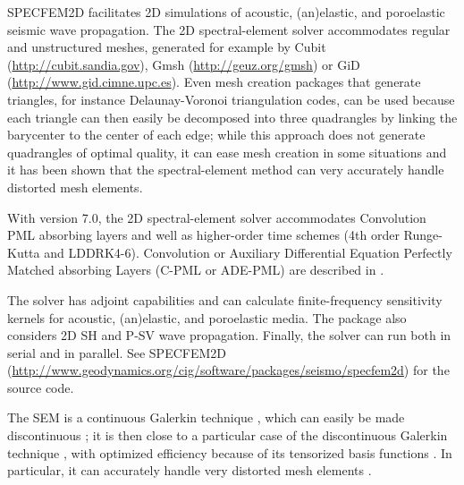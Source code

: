 \documentclass[oneside,english,onecolumn,letterpaper]{book}
\newcommand{\urlwithparentheses}[1]{(\url{#1})}
\begin{document}

SPECFEM2D facilitates 2D simulations of
acoustic, (an)elastic, and poroelastic seismic wave propagation.
The 2D spectral-element solver accommodates
regular and unstructured meshes, generated for example by Cubit
\urlwithparentheses{http://cubit.sandia.gov},
Gmsh \urlwithparentheses{http://geuz.org/gmsh}
or GiD \urlwithparentheses{http://www.gid.cimne.upc.es}.
Even mesh creation packages that generate triangles, for instance Delaunay-Voronoi triangulation codes, can be used because each triangle can then easily be decomposed into three quadrangles by linking the barycenter to the center of each edge; while this approach does not generate quadrangles of optimal quality, it can ease mesh creation in some situations and it has been shown that the spectral-element method can very accurately handle distorted mesh elements.

With version 7.0, the 2D spectral-element solver accommodates Convolution PML absorbing layers and well as higher-order time schemes
(4th order Runge-Kutta and LDDRK4-6).
Convolution or Auxiliary Differential Equation Perfectly Matched absorbing Layers (C-PML or ADE-PML)
are described in \cite{MaKoEz08,MaKoGe08,MaKo09,MaKoGeBr10,KoMa07}.

The solver has adjoint capabilities and can
calculate finite-frequency sensitivity kernels \citep{TrKoLi08,PeKoLuMaLeCaLeMaLiBlNiBaTr11} for acoustic,
(an)elastic, and poroelastic media. The package also considers 2D SH
and P-SV wave propagation. Finally, the solver can run
both in serial and in parallel. See SPECFEM2D
\urlwithparentheses{http://www.geodynamics.org/cig/software/packages/seismo/specfem2d}
for the source code.

The SEM is a continuous Galerkin technique \citep{TrKoLi08,PeKoLuMaLeCaLeMaLiBlNiBaTr11}, which can easily be made discontinuous \citep{BeMaPa94,Ch00,KoWoHu02,ChCaVi03,LaWaBe05,Kop06,WiStBuGh10,AcKo11}; it is then close to a particular case of the discontinuous Galerkin technique \citep{ReHi73,LeRa74,Arn82,JoPi86,BoMaHe91,FaRi99,HuHuRa99,CoKaSh00,GiHeWa02,RiWh03,MoRi05,GrScSc06,AiMoMu06,BeLaPi06,DuKa06,DeSeWh08,PuAmKa09,WiStBuGh10,DeSe10,EtChViGl10}, with optimized efficiency because of its tensorized basis functions \citep{WiStBuGh10,AcKo11}.
In particular, it can accurately handle very distorted mesh elements \citep{OlSe11}.
\end{document}
